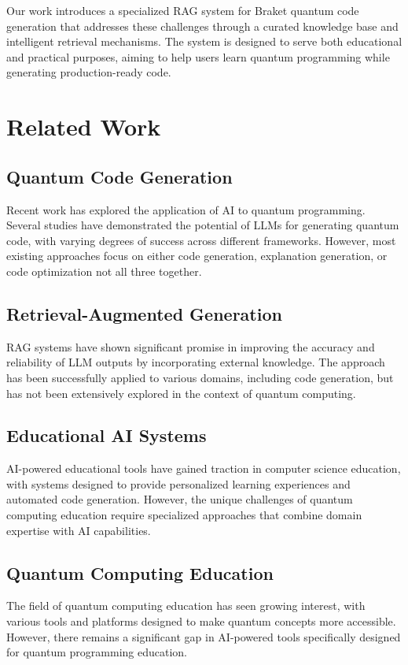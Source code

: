 \documentclass[runningheads]{llncs}
\begin{document}
Our work introduces a specialized RAG system for Braket quantum code generation that addresses these challenges through a curated knowledge base and intelligent retrieval mechanisms. The system is designed to serve both educational and practical purposes, aiming to help users learn quantum programming while generating production-ready code.

\section{Related Work}

\subsection{Quantum Code Generation}
Recent work has explored the application of AI to quantum programming. Several studies have demonstrated the potential of LLMs for generating quantum code, with varying degrees of success across different frameworks. However, most existing approaches focus on either code generation, explanation generation, or code optimization not all three together.

\subsection{Retrieval-Augmented Generation}
RAG systems have shown significant promise in improving the accuracy and reliability of LLM outputs by incorporating external knowledge. The approach has been successfully applied to various domains, including code generation, but has not been extensively explored in the context of quantum computing.

\subsection{Educational AI Systems}
AI-powered educational tools have gained traction in computer science education, with systems designed to provide personalized learning experiences and automated code generation. However, the unique challenges of quantum computing education require specialized approaches that combine domain expertise with AI capabilities.

\subsection{Quantum Computing Education}
The field of quantum computing education has seen growing interest, with various tools and platforms designed to make quantum concepts more accessible. However, there remains a significant gap in AI-powered tools specifically designed for quantum programming education.
\end{document}
